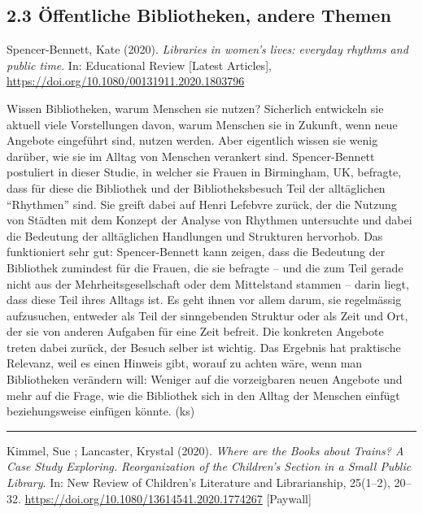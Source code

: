 \documentclass[a4paper,
fontsize=11pt,
oneside,
numbers=noperiodatend,
parskip=half-,
bibliography=totoc,
final
]{scrartcl}
\begin{document}
\hypertarget{uxf6ffentliche-bibliotheken-andere-themen}{%
\subsection{2.3 Öffentliche Bibliotheken, andere
Themen}\label{uxf6ffentliche-bibliotheken-andere-themen}}

Spencer-Bennett, Kate (2020). \emph{Libraries in women's lives: everyday
rhythms and public time}. In: Educational Review {[}Latest Articles{]},
\url{https://doi.org/10.1080/00131911.2020.1803796}

Wissen Bibliotheken, warum Menschen sie nutzen? Sicherlich entwickeln
sie aktuell viele Vorstellungen davon, warum Menschen sie in Zukunft,
wenn neue Angebote eingeführt sind, nutzen werden. Aber eigentlich
wissen sie wenig darüber, wie sie im Alltag von Menschen verankert sind.
Spencer-Bennett postuliert in dieser Studie, in welcher sie Frauen in
Birmingham, UK, befragte, dass für diese die Bibliothek und der
Bibliotheksbesuch Teil der alltäglichen \enquote{Rhythmen} sind. Sie
greift dabei auf Henri Lefebvre zurück, der die Nutzung von Städten mit
dem Konzept der Analyse von Rhythmen untersuchte und dabei die Bedeutung
der alltäglichen Handlungen und Strukturen hervorhob. Das funktioniert
sehr gut: Spencer-Bennett kann zeigen, dass die Bedeutung der Bibliothek
zumindest für die Frauen, die sie befragte -- und die zum Teil gerade
nicht aus der Mehrheitsgesellschaft oder dem Mittelstand stammen --
darin liegt, dass diese Teil ihres Alltags ist. Es geht ihnen vor allem
darum, sie regelmässig aufzusuchen, entweder als Teil der sinngebenden
Struktur oder als Zeit und Ort, der sie von anderen Aufgaben für eine
Zeit befreit. Die konkreten Angebote treten dabei zurück, der Besuch
selber ist wichtig. Das Ergebnis hat praktische Relevanz, weil es einen
Hinweis gibt, worauf zu achten wäre, wenn man Bibliotheken verändern
will: Weniger auf die vorzeigbaren neuen Angebote und mehr auf die
Frage, wie die Bibliothek sich in den Alltag der Menschen einfügt
beziehungsweise einfügen könnte. (ks)

\begin{center}\rule{0.5\linewidth}{0.5pt}\end{center}

Kimmel, Sue ; Lancaster, Krystal (2020). \emph{Where are the Books about
Trains? A Case Study Exploring. Reorganization of the Children's Section
in a Small Public Library}. In: New Review of Children's Literature and
Librarianship, 25(1--2), 20--32.
\url{https://doi.org/10.1080/13614541.2020.1774267} {[}Paywall{]}
\end{document}
